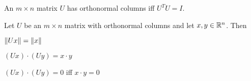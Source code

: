 \begin{card}
    \begin{theorem}
    An $m \times n$ matrix $U$ has orthonormal columns iff $U^TU = I$.
    \end{theorem}

    \begin{theorem}\label{th-ortho-algebra}
    Let $U$ be an $m \times n$ matrix with orthonormal columns and let $x, y \in \mathbb{R}^n$.
    Then
    \begin{compactenum}
    \item $\lVert Ux\rVert = \lVert x\rVert$
    \item $(Ux)\cdot(Uy) = x\cdot y$
    \item $(Ux) \cdot (Uy) = 0$ iff $x \cdot y = 0$
    \end{compactenum}
    \end{theorem}
\end{card}



